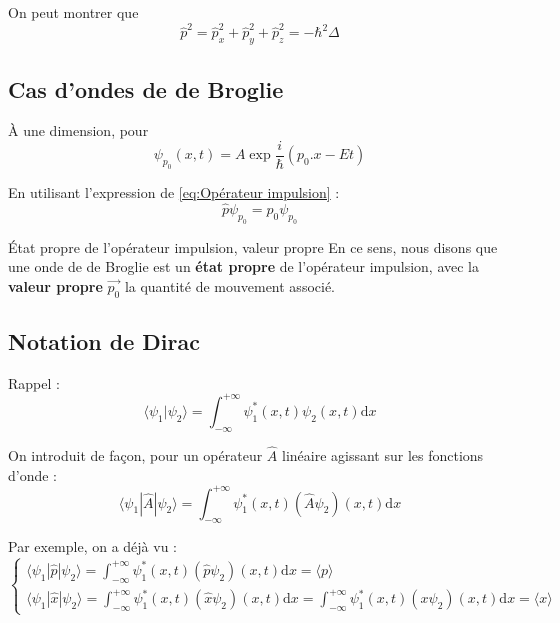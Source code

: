 On peut montrer que 
\begin{equation}
  \hat{p} ^{2} = \hat{p}_x ^{2} + \hat{p}_y ^{2} + \hat{p}_z ^{2} = - \hbar ^{2} \Delta
\end{equation}

\subsection{Cas d'ondes de de Broglie} %
\label{sub:Cas d'ondes de de Broglie}

À une dimension, pour $$\psi _{p_0}(x,t) = A \exp \frac{i}{\hbar} ({p_0} . x - Et)$$

En utilisant l'expression de \ref{eq:Opérateur impulsion} : 
\begin{equation}
  \hat{p} \psi _{p_0} = p_0 \psi _{p_0}
\end{equation}

\begin{Definition}[colbacktitle=red!75!black]{État propre de l'opérateur impulsion, valeur propre}{}
En ce sens, nous disons que une onde de de Broglie est un \textbf{état propre} de l'opérateur impulsion, avec la \textbf{valeur propre} $\overrightarrow{p_0}$ la quantité de mouvement associé.

\end{Definition}



\subsection{Notation de Dirac} %
\label{sub:Notation de Dirac}

Rappel : 
\begin{equation}
  \langle \psi_1 | \psi_2 \rangle = \int_{- \infty}^{+ \infty} \psi_1 ^{*}(x,t) \psi_2(x,t) \mathrm{d}x
\end{equation}

On introduit de façon, pour un opérateur $\hat{A}$ linéaire agissant sur les fonctions d'onde : 
\begin{equation}
  \langle \psi_1 | \hat{A} | \psi_2 \rangle = \int_{-\infty}^{+\infty} \psi_1 ^{*}(x,t) (\hat{A} \psi_2)(x,t) \mathrm{d}x
\end{equation}

Par exemple, on a déjà vu : 
\begin{equation}
\begin{cases}
 \langle \psi_1 | \hat{p} | \psi_2 \rangle = \int_{-\infty}^{+\infty} \psi_1 ^{*}(x,t) (\hat{p} \psi_2)(x,t) \mathrm{d}x = \langle p \rangle  \\
\langle \psi_1 | \hat{x} | \psi_2 \rangle = \int_{-\infty}^{+\infty} \psi_1 ^{*}(x,t) (\hat{x} \psi_2)(x,t) \mathrm{d}x = \int_{-\infty}^{+\infty} \psi_1 ^{*}(x,t) ({x} \psi_2)(x,t) \mathrm{d}x = \langle x \rangle
\end{cases}
\end{equation}

